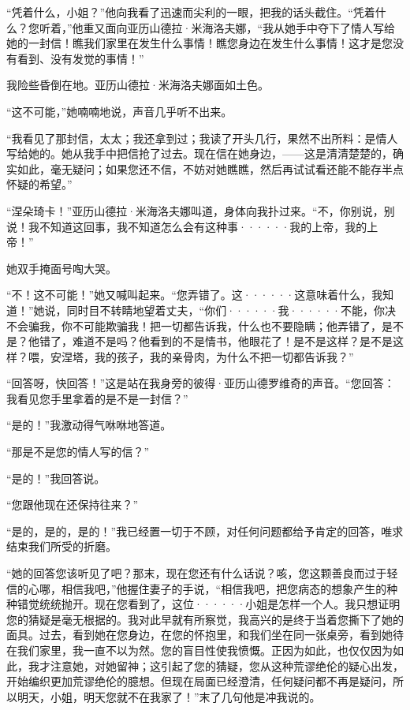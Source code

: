 \documentclass[12pt, UTF8]{ctexbook}
\begin{document}
\par “凭着什么，小姐？”他向我看了迅速而尖利的一眼，把我的话头截住。“凭着什么？您听着，”他重又面向亚历山德拉·米海洛夫娜，“我从她手中夺下了情人写给她的一封信！瞧我们家里在发生什么事情！瞧您身边在发生什么事情！这才是您没有看到、没有发觉的事情！”
\par 我险些昏倒在地。亚历山德拉·米海洛夫娜面如土色。
\par “这不可能，”她喃喃地说，声音几乎听不出来。
\par “我看见了那封信，太太；我还拿到过；我读了开头几行，果然不出所料：是情人写给她的。她从我手中把信抢了过去。现在信在她身边，——这是清清楚楚的，确实如此，毫无疑问；如果您还不信，不妨对她瞧瞧，然后再试试看还能不能存半点怀疑的希望。”
\par “涅朵琦卡！”亚历山德拉·米海洛夫娜叫道，身体向我扑过来。“不，你别说，别说！我不知道这回事，我不知道怎么会有这种事······我的上帝，我的上帝！”
\par 她双手掩面号啕大哭。
\par “不！这不可能！”她又喊叫起来。“您弄错了。这······这意味着什么，我知道！”她说，同时目不转睛地望着丈夫，“你们······我······不能，你决不会骗我，你不可能欺骗我！把一切都告诉我，什么也不要隐瞒；他弄错了，是不是？他错了，难道不是吗？他看到的不是情书，他眼花了！是不是这样？是不是这样？喂，安涅塔，我的孩子，我的亲骨肉，为什么不把一切都告诉我？”
\par “回答呀，快回答！”这是站在我身旁的彼得·亚历山德罗维奇的声音。“您回答：我看见您手里拿着的是不是一封信？”
\par “是的！”我激动得气咻咻地答道。
\par “那是不是您的情人写的信？”
\par “是的！”我回答说。
\par “您跟他现在还保持往来？”
\par “是的，是的，是的！”我已经置一切于不顾，对任何问题都给予肯定的回答，唯求结束我们所受的折磨。
\par “她的回答您该听见了吧？那末，现在您还有什么话说？咳，您这颗善良而过于轻信的心哪，相信我吧，”他握住妻子的手说，“相信我吧，把您病态的想象产生的种种错觉统统抛开。现在您看到了，这位······小姐是怎样一个人。我只想证明您的猜疑是毫无根据的。我对此早就有所察觉，我高兴的是终于当着您撕下了她的面具。过去，看到她在您身边，在您的怀抱里，和我们坐在同一张桌旁，看到她待在我们家里，我一直不以为然。您的盲目性使我愤慨。正因为如此，也仅仅因为如此，我才注意她，对她留神；这引起了您的猜疑，您从这种荒谬绝伦的疑心出发，开始编织更加荒谬绝伦的臆想。但现在局面已经澄清，任何疑问都不再是疑问，所以明天，小姐，明天您就不在我家了！”末了几句他是冲我说的。
\end{document}
